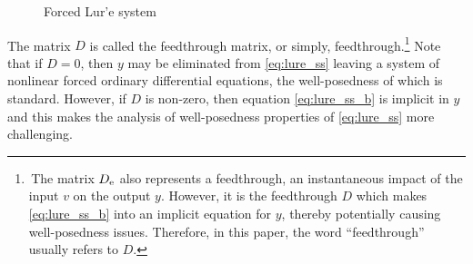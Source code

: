 \documentclass[a4paper,11pt]{article}
\numberwithin{equation}{section}
\numberwithin{figure}{section}
\numberwithin{table}{section}
\begin{document}
\begin{figure}[h!]
\centering
{}
\caption{Forced Lur'e system}
\label{fig:lure_system}
\end{figure}

The matrix $D$ is called the feedthrough matrix, or simply, feedthrough.\footnote[2]{\,The matrix $D_{\rm e}$ also represents a feedthrough, an instantaneous impact of the input $v$ on the output $y$. However, it is the feedthrough $D$ which makes \eqref{eq:lure_ss_b} into an implicit equation for $y$, thereby potentially causing well-posedness issues. Therefore, in this paper,
the word ``feedthrough'' usually refers to $D$.}
Note that if $D=0$, then $y$ may be eliminated from \eqref{eq:lure_ss} leaving a system of nonlinear forced ordinary differential equations, the well-posedness of which is standard. However, if $D$ is non-zero, then equation \eqref{eq:lure_ss_b} is implicit in $y$ and this makes the analysis of well-posedness properties of \eqref{eq:lure_ss} more challenging.
\end{document}
